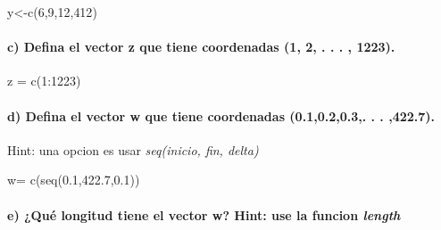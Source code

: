 \documentclass[
]{article}
\newenvironment{Shaded}{\begin{snugshade}}{\end{snugshade}}
\newcommand{\DecValTok}[1]{\textcolor[rgb]{0.00,0.00,0.81}{#1}}
\newcommand{\FloatTok}[1]{\textcolor[rgb]{0.00,0.00,0.81}{#1}}
\newcommand{\FunctionTok}[1]{\textcolor[rgb]{0.00,0.00,0.00}{#1}}
\newcommand{\NormalTok}[1]{#1}
\newcommand{\OtherTok}[1]{\textcolor[rgb]{0.56,0.35,0.01}{#1}}
\newcommand{\SpecialCharTok}[1]{\textcolor[rgb]{0.00,0.00,0.00}{#1}}
\begin{document}
\begin{Shaded}
\begin{Highlighting}[]
\NormalTok{y}\OtherTok{\textless{}{-}}\FunctionTok{c}\NormalTok{(}\DecValTok{6}\NormalTok{,}\DecValTok{9}\NormalTok{,}\DecValTok{12}\NormalTok{,}\DecValTok{412}\NormalTok{)}
\end{Highlighting}
\end{Shaded}

\hypertarget{c-defina-el-vector-z-que-tiene-coordenadas-1-2-.-.-.-1223.}{%
\paragraph{c) Defina el vector z que tiene coordenadas (1, 2, . . . ,
1223).}\label{c-defina-el-vector-z-que-tiene-coordenadas-1-2-.-.-.-1223.}}

\begin{Shaded}
\begin{Highlighting}[]
\NormalTok{z }\OtherTok{=} \FunctionTok{c}\NormalTok{(}\DecValTok{1}\SpecialCharTok{:}\DecValTok{1223}\NormalTok{)}
\end{Highlighting}
\end{Shaded}

\hypertarget{d-defina-el-vector-w-que-tiene-coordenadas-0.10.20.3.-.-.-422.7.}{%
\paragraph{d) Defina el vector w que tiene coordenadas (0.1,0.2,0.3,. .
.
,422.7).}\label{d-defina-el-vector-w-que-tiene-coordenadas-0.10.20.3.-.-.-422.7.}}

Hint: una opcion es usar \emph{seq(inicio, fin, delta)}

\begin{Shaded}
\begin{Highlighting}[]
\NormalTok{w}\OtherTok{=} \FunctionTok{c}\NormalTok{(}\FunctionTok{seq}\NormalTok{(}\FloatTok{0.1}\NormalTok{,}\FloatTok{422.7}\NormalTok{,}\FloatTok{0.1}\NormalTok{))}
\end{Highlighting}
\end{Shaded}

\hypertarget{e-quuxe9-longitud-tiene-el-vector-w-hint-use-la-funcion-length}{%
\paragraph{\texorpdfstring{e) ¿Qué longitud tiene el vector w? Hint: use
la funcion
\emph{length}}{e) ¿Qué longitud tiene el vector w? Hint: use la funcion length}}\label{e-quuxe9-longitud-tiene-el-vector-w-hint-use-la-funcion-length}}
\end{document}
